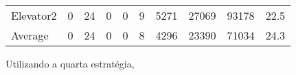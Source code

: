 ﻿\documentclass[a4paper]{article}
\begin{document}
\begin{table}[h]
\begin{tabular}{@{}llllllllll@{}}
Elevator2 & 0        & 24            & 0           & 0                                                               & 9                                                                  & 5271                                                         & 27069                                                 & 93178                                                   & 22.5         \\
Average   & 0     & 24         & 0        & 0                                                               & 8                                                               & 4296                                                         & 23390                                                 &  71034                                                  & 24.3         \\ \bottomrule
\end{tabular}
\end{table}

Utilizando a quarta estratégia,
\end{document}
